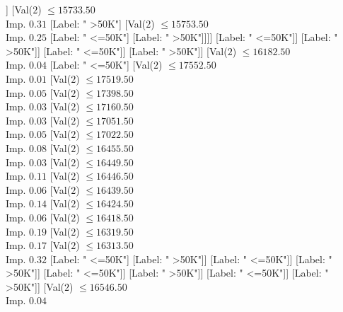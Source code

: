 \documentclass[margin=10pt]{standalone}
\begin{document}
\begin{forest}
																							[Label: " <=50K"]]
																						[Val($2$) $ \leq 15733.50$ \\ Imp. $0.31$
																							[Label: " >50K"]
																							[Val($2$) $ \leq 15753.50$ \\ Imp. $0.25$
																								[Label: " <=50K"]
																								[Label: " >50K"]]]]
																					[Label: " <=50K"]]
																				[Label: " >50K"]]
																			[Label: " <=50K"]]
																		[Label: " >50K"]]
																	[Val($2$) $ \leq 16182.50$ \\ Imp. $0.04$
																		[Label: " <=50K"]
																		[Val($2$) $ \leq 17552.50$ \\ Imp. $0.01$
																			[Val($2$) $ \leq 17519.50$ \\ Imp. $0.05$
																				[Val($2$) $ \leq 17398.50$ \\ Imp. $0.03$
																					[Val($2$) $ \leq 17160.50$ \\ Imp. $0.03$
																						[Val($2$) $ \leq 17051.50$ \\ Imp. $0.05$
																							[Val($2$) $ \leq 17022.50$ \\ Imp. $0.08$
																								[Val($2$) $ \leq 16455.50$ \\ Imp. $0.03$
																									[Val($2$) $ \leq 16449.50$ \\ Imp. $0.11$
																										[Val($2$) $ \leq 16446.50$ \\ Imp. $0.06$
																											[Val($2$) $ \leq 16439.50$ \\ Imp. $0.14$
																												[Val($2$) $ \leq 16424.50$ \\ Imp. $0.06$
																													[Val($2$) $ \leq 16418.50$ \\ Imp. $0.19$
																														[Val($2$) $ \leq 16319.50$ \\ Imp. $0.17$
																															[Val($2$) $ \leq 16313.50$ \\ Imp. $0.32$
																																[Label: " <=50K"]
																																[Label: " >50K"]]
																															[Label: " <=50K"]]
																														[Label: " >50K"]]
																													[Label: " <=50K"]]
																												[Label: " >50K"]]
																											[Label: " <=50K"]]
																										[Label: " >50K"]]
																									[Val($2$) $ \leq 16546.50$ \\ Imp. $0.04$

\end{forest}
\end{document}
